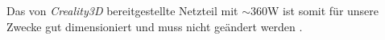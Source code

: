 Das von \textit{Creality3D} bereitgestellte Netzteil mit $\sim360$W ist somit für unsere Zwecke gut dimensioniert und muss nicht geändert werden \cite{ender3_spezifiaktion}. 












